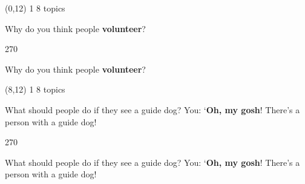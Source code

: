 \documentclass[a4paper]{article}
\newenvironment{itemize*}%
{\begin{itemize}%
 \setlength{\itemsep}{0.5cm}%
 \setlength{\parsep}{0pt}%
 \setlength{\parskip}{0pt}}%
{\end{itemize}}
\newcommand{\mycard}[3]{%
	\small #1 #2
	\par
	\parbox[t][6.8cm][c]{9.5cm}{%
	\par
	\myleft{#3}
	\par
	\myright{#3}
	}
}
\newcommand{\myleft}[1]{%
	\begin{sideways}
	\hspace*{-0.9cm}
		\parbox[t][2.7cm][t]{6.5cm}{%
		\large #1
		}
	\end{sideways}
}
\newcommand{\myright}[1]{%
	\hspace*{6.5cm}
	\begin{turn}{270}
	\hspace*{-7.1cm}
		\parbox[t][2.7cm][t]{6.5cm}{%
		\large #1
		}
	\end{turn}
}
\begin{document}
\begin{textblock}{8}(0,12)
\mycard{1}{8 topics}{
\begin{itemize*}
\item Why do you think people \textbf{volunteer}?
\end{itemize*}
}
\end{textblock}

\begin{textblock}{8}(8,12)
\mycard{1}{8 topics}{
\begin{itemize*}
\item What should people do if they see a guide dog? You: `\textbf{Oh, my gosh}! There's a person with a guide dog!
\end{itemize*}
}
\end{textblock}

\null
\newpage
\end{document}
